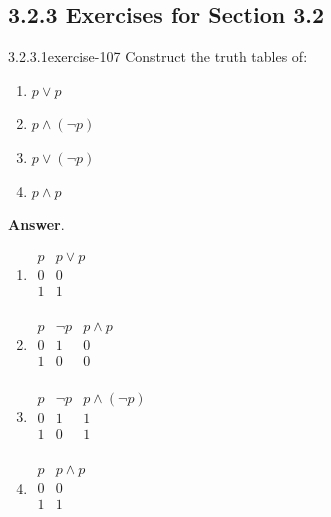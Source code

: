 \documentclass[twoside,10pt,]{book}
\numberwithin{equation}{section}
\begin{document}
\subsection*{3.2.3 Exercises for Section 3.2}
\begin{divisionsolution}{3.2.3.1}{}{exercise-107}%
\hypertarget{p-961}{}%
Construct the truth tables of:\leavevmode%
\begin{multicols}{2}
\begin{enumerate}[label=(\alph*)]
\item\hypertarget{li-535}{}\hypertarget{p-962}{}%
\(p\lor p\)%
\item\hypertarget{li-536}{}\hypertarget{p-963}{}%
\(p\land (\neg p)\)%
\item\hypertarget{li-537}{}\hypertarget{p-964}{}%
\(p\lor (\neg p)\)%
\item\hypertarget{li-538}{}\hypertarget{p-965}{}%
\(p \land p\)%
\end{enumerate}
\end{multicols}
%
\par\smallskip%
\noindent\textbf{Answer}.\quad%
\hypertarget{p-966}{}%
\leavevmode%
\begin{enumerate}[label=(\alph*)]
\item\hypertarget{li-539}{}\hypertarget{p-967}{}%
\(\begin{array}{cc}
p & p\lor p \\
\hline
0 & 0 \\
1 & 1 \\
\end{array}\)%
\item\hypertarget{li-540}{}\(\begin{array}{ccc}
p & \neg p & p\land p \\
\hline
0 & 1 & 0 \\
1 & 0 & 0 \\
\end{array}\)%
\item\hypertarget{li-541}{}\(\begin{array}{ccc}
p & \neg p & p\land (\neg p) \\
\hline
0 & 1 & 1 \\
1 & 0 & 1 \\
\end{array}\)%
\item\hypertarget{li-542}{}\(\begin{array}{cc}
p & p\land p \\
\hline
0 & 0 \\
1 & 1 \\
\end{array}\)%
\end{enumerate}
%
\end{divisionsolution}%
\end{document}
